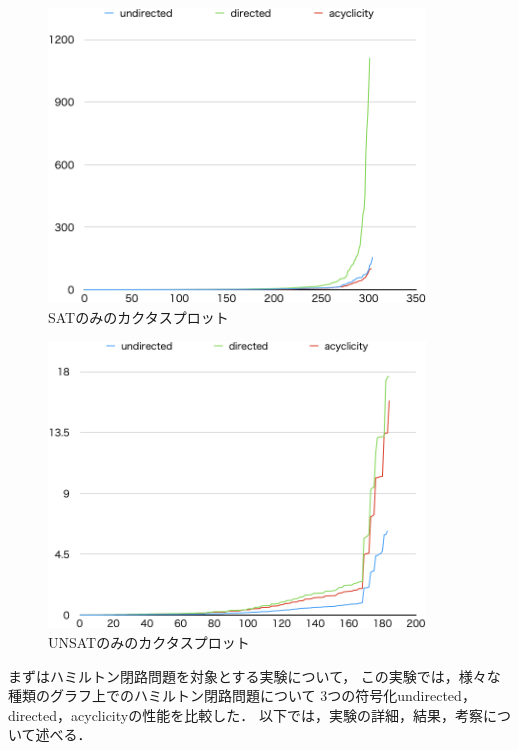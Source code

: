 \begin{figure}[tb]
\begin{center}
  \includegraphics[width=10cm]{fig/cactussat.png}
\caption{SATのみのカクタスプロット}
\label{cactussat}
\end{center}
\end{figure}

\begin{figure}[tb]
\begin{center}
  \includegraphics[width=10cm]{fig/cactusunsat.png}
\caption{UNSATのみのカクタスプロット}
\label{cactusunsat}
\end{center}
\end{figure}

まずはハミルトン閉路問題を対象とする実験について，
この実験では，様々な種類のグラフ上でのハミルトン閉路問題について
3つの符号化\textsf{undirected}，\textsf{directed}，\textsf{acyclicity}の性能を比較した．
以下では，実験の詳細，結果，考察について述べる．

